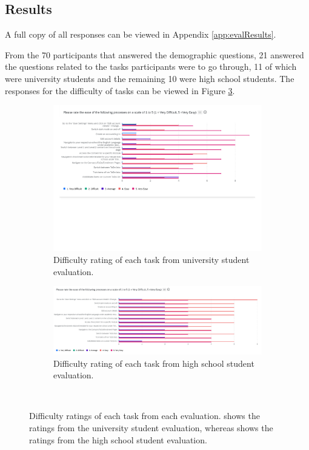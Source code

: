 \documentclass{l4proj}
\begin{document}
\subsection{Results}
A full copy of all responses can be viewed in Appendix \ref{app:evalResults}. 

From the 70 participants that answered the demographic questions,  21 answered the questions related to the tasks participants were to go through,  11 of which were university students and the remaining 10 were high school students. The responses for the difficulty of tasks can be viewed in Figure \ref{fig:difficulty}.

\begin{figure}[ht]
    \centering
    \begin{subfigure}[b]{\textwidth}
        \includegraphics[width=\linewidth]{images/uniStudentsDifficulty.pdf}    
        \caption{Difficulty rating of each task from university student evaluation.}
        \label{fig:uniDifficulty} 
    \end{subfigure}
    \centering
    \begin{subfigure}[b]{\textwidth}
        \includegraphics[width=\linewidth]{images/highschoolStudentsDifficulty.pdf}    
        \caption{Difficulty rating of each task from high school student evaluation.}
        \label{fig:highschoolDifficulty} 
    \end{subfigure}
    ~ %
    \caption{Difficulty ratings of each task from each evaluation.  shows the ratings from the university student evaluation,  whereas  shows the ratings from the high school student evaluation.
    }\label{fig:difficulty}
\end{figure}
\end{document}
